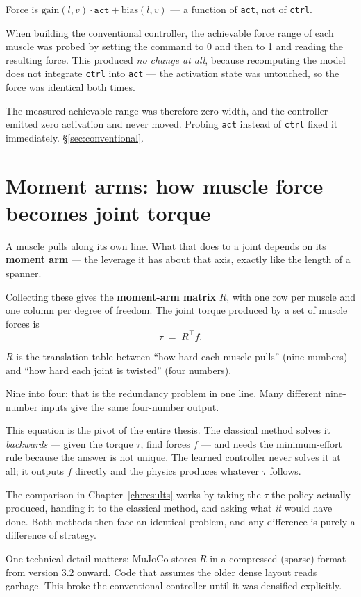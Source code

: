 Force is $\text{gain}(l,v)\cdot \texttt{act} + \text{bias}(l,v)$ --- a function of
\texttt{act}, not of \texttt{ctrl}.

\begin{trap}
When building the conventional controller, the achievable force range of each
muscle was probed by setting the command to 0 and then to 1 and reading the
resulting force. This produced \emph{no change at all}, because recomputing the
model does not integrate \texttt{ctrl} into \texttt{act} --- the activation state
was untouched, so the force was identical both times.

The measured achievable range was therefore zero-width, and the controller
emitted zero activation and never moved. Probing \texttt{act} instead of
\texttt{ctrl} fixed it immediately. \S\ref{sec:conventional}.
\end{trap}

\section{Moment arms: how muscle force becomes joint torque}

A muscle pulls along its own line. What that does to a joint depends on its
\textbf{moment arm} --- the leverage it has about that axis, exactly like the
length of a spanner.

Collecting these gives the \textbf{moment-arm matrix} $R$, with one row per
muscle and one column per degree of freedom. The joint torque produced by a set
of muscle forces is
\[
\tau \;=\; R^{\top} f.
\]

\begin{plain}
$R$ is the translation table between ``how hard each muscle pulls'' (nine
numbers) and ``how hard each joint is twisted'' (four numbers).

Nine into four: that is the redundancy problem in one line. Many different
nine-number inputs give the same four-number output.
\end{plain}

\begin{why}
This equation is the pivot of the entire thesis. The classical method solves it
\emph{backwards} --- given the torque $\tau$, find forces $f$ --- and needs the
minimum-effort rule because the answer is not unique. The learned controller
never solves it at all; it outputs $f$ directly and the physics produces whatever
$\tau$ follows.

The comparison in Chapter~\ref{ch:results} works by taking the $\tau$ the policy
actually produced, handing it to the classical method, and asking what \emph{it}
would have done. Both methods then face an identical problem, and any difference
is purely a difference of strategy.

One technical detail matters: MuJoCo stores $R$ in a compressed (sparse) format
from version 3.2 onward. Code that assumes the older dense layout reads garbage.
This broke the conventional controller until it was densified explicitly.
\end{why}
